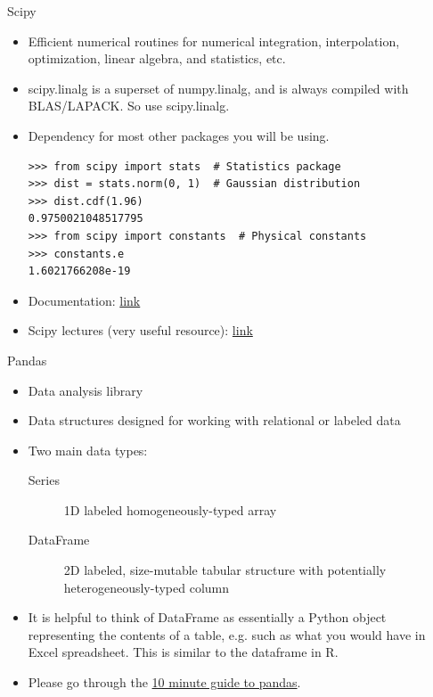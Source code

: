 \documentclass[aspectratio=169]{beamer}
\begin{document}
\begin{frame}[fragile]{Scipy}
    \begin{itemize}
        \item Efficient numerical routines for numerical integration, interpolation, optimization, linear algebra, and statistics, etc.
        \item scipy.linalg is a superset of numpy.linalg, and is always compiled with BLAS/LAPACK. So use scipy.linalg.
        \item Dependency for most other packages you will be using.
    \begin{lstlisting}
>>> from scipy import stats  # Statistics package
>>> dist = stats.norm(0, 1)  # Gaussian distribution
>>> dist.cdf(1.96)
0.9750021048517795
>>> from scipy import constants  # Physical constants
>>> constants.e
1.6021766208e-19
    \end{lstlisting}
    \item Documentation: \href{https://docs.scipy.org/doc/scipy/reference/}{link}
    \item Scipy lectures (very useful resource): \href{https://scipy-lectures.org/}{link}
    \end{itemize}
\end{frame}


\begin{frame}{Pandas}
    \begin{itemize}
        \item Data analysis library
        \item Data structures designed for working with relational or labeled data
        \item Two main data types:
        \begin{description}
        \item[Series] 1D labeled homogeneously-typed array
        \item[DataFrame] 2D labeled, size-mutable tabular structure with potentially heterogeneously-typed column
        \end{description}
        \item It is helpful to think of DataFrame as essentially a Python object representing the contents of a table, e.g. such as what you would have in Excel spreadsheet. This is similar to the dataframe in R.
        \item Please go through the \href{http://pandas.pydata.org/pandas-docs/stable/getting_started/10min.html}{10 minute guide to pandas}.
    \end{itemize}
\end{frame}
\end{document}
